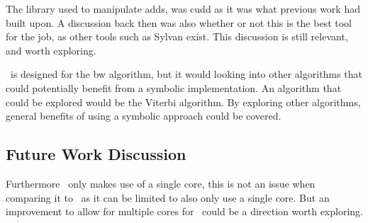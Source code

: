 The library used to manipulate \glspl{add}, was \gls{cudd} as it was what previous work had built upon.
A discussion back then was also whether or not this is the best tool for the job, as other tools such as Sylvan exist.
This discussion is still relevant, and worth exploring.

\Cupaal\ is designed for the \gls{bw} algorithm, but it would looking into other algorithms that could potentially benefit from a symbolic implementation.
An algorithm that could be explored would be the Viterbi algorithm.
By exploring other algorithms, general benefits of using a symbolic approach could be covered.



\subsection{Future Work Discussion}
Furthermore \Cupaal\ only makes use of a single core, this is not an issue when comparing it to \Jajapy\ as it can be limited to also only use a single core.
But an improvement to allow for multiple cores for \Cupaal\ could be a direction worth exploring.





